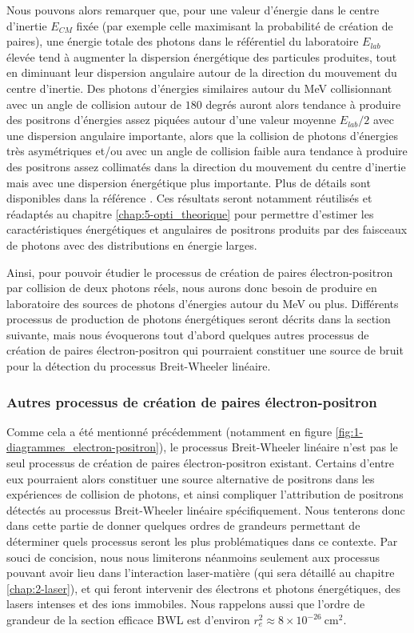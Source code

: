 \begin{refsection}
Nous pouvons alors remarquer que, pour une valeur d'énergie dans le centre d'inertie $E_{CM}$ fixée (par exemple celle maximisant la probabilité de création de paires), une énergie totale des photons dans le référentiel du laboratoire $E_{lab}$ élevée tend à augmenter la dispersion énergétique des particules produites, tout en diminuant leur dispersion angulaire autour de la direction du mouvement du centre d'inertie. Des photons d'énergies similaires autour du MeV collisionnant avec un angle de collision autour de $180$ degrés auront alors tendance à produire des positrons d'énergies assez piquées autour d'une valeur moyenne $E_{lab}/2$ avec une dispersion angulaire importante, alors que la collision de photons d'énergies très asymétriques et/ou avec un angle de collision faible aura tendance à produire des positrons assez collimatés dans la direction du mouvement du centre d'inertie mais avec une dispersion énergétique plus importante. Plus de détails sont disponibles dans la référence \parencite{ribeyre_2017}. Ces résultats seront notamment réutilisés et réadaptés au chapitre \ref{chap:5-opti_theorique} pour permettre d'estimer les caractéristiques énergétiques et angulaires de positrons produits par des faisceaux de photons avec des distributions en énergie larges.



Ainsi, pour pouvoir étudier le processus de création de paires électron-positron par collision de deux photons réels, nous aurons donc besoin de produire en laboratoire des sources de photons d'énergies autour du MeV ou plus. Différents processus de production de photons énergétiques seront décrits dans la section suivante, mais nous évoquerons tout d'abord quelques autres processus de création de paires électron-positron qui pourraient constituer une source de bruit pour la détection du processus Breit-Wheeler linéaire.


\subsubsection{Autres processus de création de paires électron-positron}

Comme cela a été mentionné précédemment (notamment en figure \ref{fig:1-diagrammes_electron-positron}), le processus Breit-Wheeler linéaire n'est pas le seul processus de création de paires électron-positron existant. Certains d'entre eux pourraient alors constituer une source alternative de positrons dans les expériences de collision de photons, et ainsi compliquer l'attribution de positrons détectés au processus Breit-Wheeler linéaire spécifiquement. Nous tenterons donc dans cette partie de donner quelques ordres de grandeurs permettant de déterminer quels processus seront les plus problématiques dans ce contexte. Par souci de concision, nous nous limiterons néanmoins seulement aux processus pouvant avoir lieu dans l'interaction laser-matière (qui sera détaillé au chapitre \ref{chap:2-laser}), et qui feront intervenir des électrons et photons énergétiques, des lasers intenses et des ions immobiles. Nous rappelons aussi que l'ordre de grandeur de la section efficace BWL est d'environ $r_e^2 \approx 8 \times 10^{-26} ~ \si{\cm^2}$.



\end{refsection}
